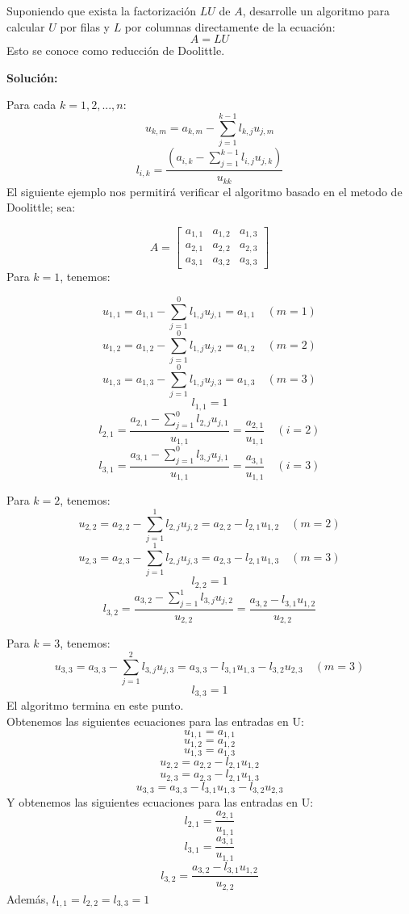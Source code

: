 Suponiendo que exista la factorización $LU$ de $A$, desarrolle un algoritmo para calcular $U$ por filas y $L$ por columnas directamente de la ecuación:
\[
    A = LU
\]
Esto se conoce como reducción de Doolittle.

\textbf{Solución:}

Para cada $k=1,2,...,n$:
\[
    u_{k, m} = a_{k, m} - \sum_{j=1}^{k-1} l_{k,j} u_{j,m}
\]
\[
    l_{i, k} = \frac{(a_{i, k} - \sum_{j=1}^{k-1} l_{i,j} u_{j, k})}{u_{kk}}
\]
El siguiente ejemplo nos permitirá verificar el algoritmo basado en el metodo de Doolittle; sea:

\[
    A = \begin{bmatrix}a_{1,1} & a_{1,2} & a_{1,3}\\ a_{2,1} & a_{2,2} & a_{2,3}\\ a_{3,1} & a_{3,2} & a_{3,3} \end{bmatrix}
\]
Para $k=1$, tenemos:

\[
    u_{1, 1} = a_{1, 1} - \sum_{j=1}^{0} l_{1,j} u_{j, 1} = a_{1, 1} \quad ( m = 1 )
\]
\[
    u_{1, 2} = a_{1, 2} - \sum_{j=1}^{0} l_{1,j}u_{j, 2} = a_{1,2} \quad ( m = 2 )
\]
\[
    u_{1, 3} = a_{1, 3} - \sum_{j=1}^{0} l_{1, j} u_{j, 3} = a_{1, 3} \quad ( m = 3 )
\]
\[
    l_{1, 1} = 1
\]
\[
    l_{2, 1} = \frac{a_{2, 1} - \sum_{j=1}^{0} l_{2,j}u_{j,1}}{u_{1,1}} = \frac{a_{2, 1}}{u_{1, 1}} \quad (i = 2)
\]
\[
    l_{3, 1} = \frac{a_{3, 1} - \sum_{j=1}^{0} l_{3,j}u_{j,1}}{u_{1, 1}} = \frac{a_{3, 1}}{u_{1, 1}} \quad (i = 3)
\]

Para $k=2$, tenemos:
\[
    u_{2, 2} = a_{2, 2} - \sum_{j=1}^{1} l_{2,j} u_{j,2} = a_{2, 2} - l_{2, 1}u_{1, 2} \quad (m = 2)
\]
\[
    u_{2, 3} = a_{2, 3} - \sum_{j=1}^{1} l_{2, j} u_{j, 3} = a_{2, 3} - l_{2, 1} u_{1, 3} \quad (m = 3)
\]
\[
    l_{2, 2} = 1
\]
\[
    l_{3, 2} = \frac{a_{3, 2} - \sum_{j=1}^{1} l_{3,j} u_{j, 2}}{u_{2, 2}} = \frac{a_{3, 2} - l_{3, 1} u_{1, 2}}{u_{2, 2}}
\]

Para $k=3$, tenemos:
\[
    u_{3, 3} = a_{3, 3} - \sum_{j=1}^{2} l_{3, j} u_{j, 3} = a_{3, 3} - l_{3, 1} u_{1, 3} - l_{3, 2} u_{2, 3} \quad (m = 3)
\]
\[
    l_{3, 3} = 1
\]
El algoritmo termina en este punto.\\
Obtenemos las siguientes ecuaciones para las entradas en U:
\[
    u_{1, 1} = a_{1, 1}
\]
\[
    u_{1, 2} = a_{1, 2}
\]
\[
    u_{1, 3} = a_{1, 3}
\]
\[
    u_{2, 2} = a_{2, 2} - l_{2, 1} u_{1, 2}
\]
\[
    u_{2, 3} = a_{2, 3} - l_{2, 1} u_{1, 3}
\]
\[
    u_{3, 3} = a_{3, 3} - l_{3, 1} u_{1, 3} - l_{3, 2} u_{2, 3}
\]
Y obtenemos las siguientes ecuaciones para las entradas en U:
\[
    l_{2, 1} = \frac{a_{2, 1}}{u_{1, 1}}
\]
\[
    l_{3, 1} = \frac{a_{3, 1}}{u_{1, 1}}
\]
\[
    l_{3, 2} = \frac{a_{3, 2} - l_{3, 1} u_{1, 2}}{u_{2, 2}}
\]
Además, $l _{1, 1} = l_{2, 2} = l_{3, 3} = 1$
    